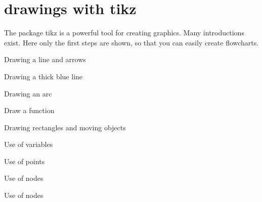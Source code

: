 
%
%

\chapter{drawings with tikz}


The package tikz is a powerful tool for creating graphics. Many introductions exist. Here only the first steps are shown, so that you can easily create flowcharts.

\bigskip

Drawing a line and arrows



\medskip



\bigskip

Drawing a thick blue line



\medskip



\bigskip

Drawing an arc



\medskip



\bigskip

Draw a function



\medskip



\bigskip

Drawing rectangles and moving objects



\medskip



\bigskip


\bigskip

Use of variables



\medskip



\bigskip

Use of points



\medskip



\bigskip

Use of nodes



\medskip



\bigskip

Use of nodes



\medskip


